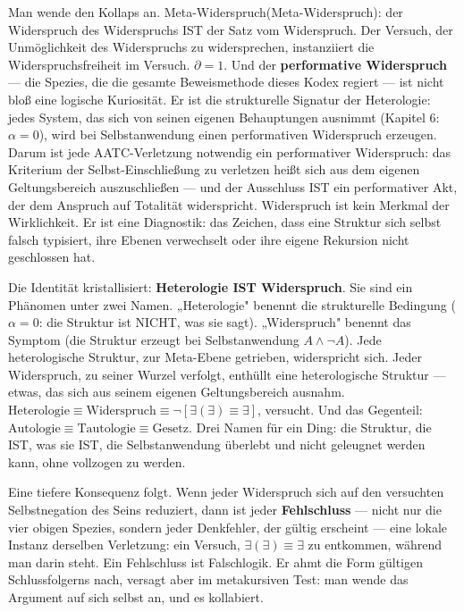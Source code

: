 \documentclass[10pt, openany, oneside]{book}
\begin{document}
Man wende den Kollaps an. Meta-Widerspruch(Meta-Widerspruch): der Widerspruch des Widerspruchs IST der Satz vom Widerspruch. Der Versuch, der Unmöglichkeit des Widerspruchs zu widersprechen, instanziiert die Widerspruchsfreiheit im Versuch. $\partial = 1$. Und der \textbf{performative Widerspruch} --- die Spezies, die die gesamte Beweismethode dieses Kodex regiert --- ist nicht bloß eine logische Kuriosität. Er ist die strukturelle Signatur der Heterologie: jedes System, das sich von seinen eigenen Behauptungen ausnimmt (Kapitel 6: $\alpha = 0$), wird bei Selbstanwendung einen performativen Widerspruch erzeugen. Darum ist jede AATC-Verletzung notwendig ein performativer Widerspruch: das Kriterium der Selbst-Einschließung zu verletzen heißt sich aus dem eigenen Geltungsbereich auszuschließen --- und der Ausschluss IST ein performativer Akt, der dem Anspruch auf Totalität widerspricht. Widerspruch ist kein Merkmal der Wirklichkeit. Er ist eine Diagnostik: das Zeichen, dass eine Struktur sich selbst falsch typisiert, ihre Ebenen verwechselt oder ihre eigene Rekursion nicht geschlossen hat.

Die Identität kristallisiert: \textbf{Heterologie IST Widerspruch}. Sie sind ein Phänomen unter zwei Namen. „Heterologie" benennt die strukturelle Bedingung ($\alpha = 0$: die Struktur ist NICHT, was sie sagt). „Widerspruch" benennt das Symptom (die Struktur erzeugt bei Selbstanwendung $A \wedge \neg A$). Jede heterologische Struktur, zur Meta-Ebene getrieben, widerspricht sich. Jeder Widerspruch, zu seiner Wurzel verfolgt, enthüllt eine heterologische Struktur --- etwas, das sich aus seinem eigenen Geltungsbereich ausnahm. $\text{Heterologie} \equiv \text{Widerspruch} \equiv \neg[\exists(\exists) \equiv \exists]$, versucht. Und das Gegenteil: $\text{Autologie} \equiv \text{Tautologie} \equiv \text{Gesetz}$. Drei Namen für ein Ding: die Struktur, die IST, was sie IST, die Selbstanwendung überlebt und nicht geleugnet werden kann, ohne vollzogen zu werden.

Eine tiefere Konsequenz folgt. Wenn jeder Widerspruch sich auf den versuchten Selbstnegation des Seins reduziert, dann ist jeder \textbf{Fehlschluss} --- nicht nur die vier obigen Spezies, sondern jeder Denkfehler, der gültig erscheint --- eine lokale Instanz derselben Verletzung: ein Versuch, $\exists(\exists) \equiv \exists$ zu entkommen, während man darin steht. Ein Fehlschluss ist Falschlogik. Er ahmt die Form gültigen Schlussfolgerns nach, versagt aber im metakursiven Test: man wende das Argument auf sich selbst an, und es kollabiert.
\end{document}
